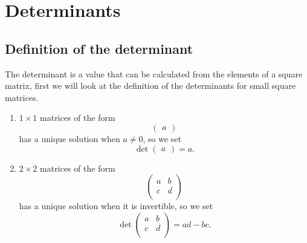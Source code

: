 \chapter{Determinants}

\section{Definition of the determinant}

The determinant is a value that can be calculated from the elements of a square matrix, first we will look at the definition of the determinants for small square matrices.

\begin{enumerate}
    \item $1\times 1$ matrices of the form
    \[
        \begin{pmatrix}
            a
        \end{pmatrix}
    \]
    has a unique solution when $a\neq 0$, so we set
    \[
        \det{
            \begin{pmatrix}
                a
            \end{pmatrix}
        }
        =a.
    \]
    
    \item $2\times 2$ matrices of the form
    \[
        \begin{pmatrix}
            a&b\\c&d\\
        \end{pmatrix}
    \]
    has a unique solution when it is invertible, so we set
    \[
        \det{
            \begin{pmatrix}
                a&b\\c&d\\
            \end{pmatrix}
        }
        =ad-bc.
    \]
    

\end{enumerate}
